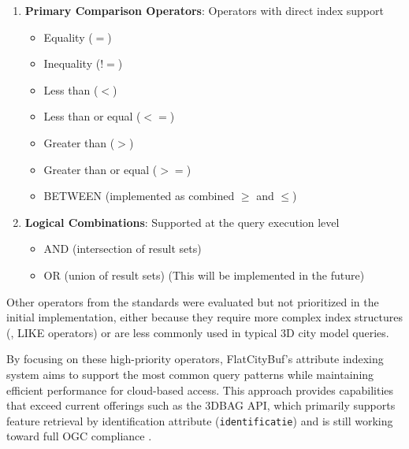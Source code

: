 \begin{enumerate}
  \item \textbf{Primary Comparison Operators}: Operators with direct index support
    \begin{itemize}
      \item Equality ($=$)
      \item Inequality ($!=$)
      \item Less than ($<$)
      \item Less than or equal ($<=$)
      \item Greater than ($>$)
      \item Greater than or equal ($>=$)
      \item BETWEEN (implemented as combined $\geq$ and $\leq$)
    \end{itemize}

  \item \textbf{Logical Combinations}: Supported at the query execution level
    \begin{itemize}
      \item AND (intersection of result sets)
      \item OR (union of result sets) (This will be implemented in the future)
    \end{itemize}

\end{enumerate}

Other operators from the standards were evaluated but not prioritized in the initial implementation, either because they require more complex index structures (\eg, LIKE operators) or are less commonly used in typical 3D city model queries.


By focusing on these high-priority operators, FlatCityBuf's attribute indexing system aims to support the most common query patterns while maintaining efficient performance for cloud-based access.  This approach provides capabilities that exceed current offerings such as the 3DBAG API, which primarily supports feature retrieval by identification attribute (\texttt{identificatie}) and is still working toward full OGC compliance \citep{3dbag_api_2023}.

